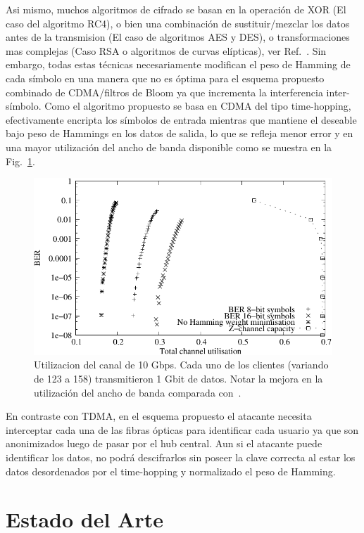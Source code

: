 Asi mismo, muchos algoritmos de cifrado se basan en la operación de XOR (El caso del algoritmo RC4), o bien una combinación de sustituir/mezclar los datos antes de la transmision (El caso de algoritmos AES y DES), o transformaciones mas complejas (Caso RSA o algoritmos de curvas elípticas), ver Ref.~\cite{Menezes:1996:HAC:548089}.
Sin embargo, todas estas técnicas necesariamente modifican el peso de Hamming de cada símbolo en una manera que no es óptima para el esquema propuesto combinado de CDMA/filtros de Bloom ya que incrementa la interferencia inter-símbolo.
Como el algoritmo propuesto se basa en CDMA del tipo time-hopping, efectivamente encripta los símbolos de entrada mientras que mantiene el deseable bajo peso de Hammings en los datos de salida, lo que se refleja menor error y en una mayor utilización del ancho de banda disponible como se muestra en la Fig.~\ref{fig_use}.

\begin{figure}[t]
  \centering
  \includegraphics[width=0.8 \textwidth]{BERvsChannel} 
  \caption{Utilizacion del canal de 10 Gbps. Cada uno de los clientes (variando de 123 a 158) transmitieron 1 Gbit de datos. Notar la mejora en la utilización del ancho de banda comparada con~\cite{ortega11}.}
  \label{fig_use}
\end{figure}

En contraste con TDMA, en el esquema propuesto el atacante necesita interceptar cada una de las fibras ópticas para identificar cada usuario ya que son anonimizados luego de pasar por el hub central. Aun si el atacante puede identificar los datos, no podrá descifrarlos sin poseer la clave correcta al estar los datos desordenados por el time-hopping y normalizado el peso de Hamming.

\section{Estado del Arte}

